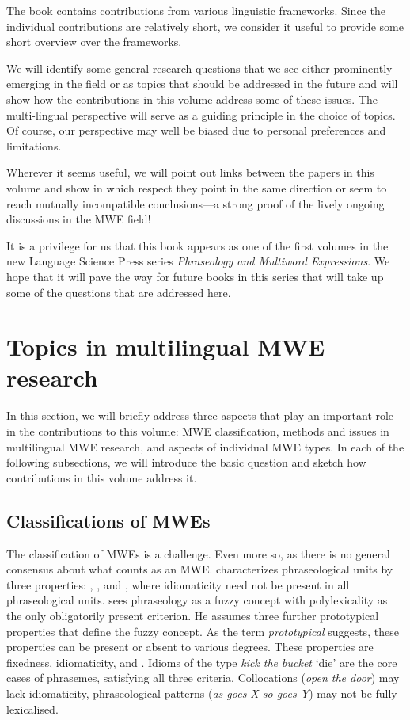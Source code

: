 \documentclass[output=paper]{langsci/langscibook}
\begin{document}
The book contains contributions from various linguistic frameworks. Since the individual contributions are relatively short, we consider it useful to provide some short overview over the frameworks. 

We will identify some general research questions that we see either prominently emerging in the field or as topics that should be addressed in the future and will show how the contributions in this volume address some of these issues. The multi-lingual perspective will serve as a guiding principle in the choice of topics. Of course, our perspective may well be biased due to personal preferences and limitations. 

Wherever it seems useful, we will point out links between the papers in this volume and show in which respect they point in the same direction or seem to reach mutually incompatible conclusions---a strong proof of the lively ongoing discussions in the MWE field!

It is a privilege for us that this book appears as one of the first volumes in the new Language Science Press series \emph{Phraseology and Multiword Expressions}. We hope that it will pave the way for future books in this series that will take up some of the questions that are addressed here.


\section{Topics in multilingual MWE research}\label{Sec-Topics}

In this section, we will briefly address three aspects that play an important role in the contributions to this volume: MWE classification, methods and issues in multilingual MWE research, and aspects of individual MWE types. In each of the following subsections, we will introduce the basic question and sketch how contributions in this volume address it.

\subsection{Classifications of MWEs}\label{Sec-Classification}
The classification of MWEs is a challenge. Even more so, as there is no general consensus about what counts as an MWE. \citet{Burger:15} characterizes phraseological units by three properties: , , and , where idiomaticity need not be present in all phraseological units. \citet{Fleischer:97} sees phraseology as a fuzzy concept with polylexicality as the only obligatorily present criterion. He assumes three further prototypical properties that define the fuzzy concept. As the term \emph{prototypical} suggests, these properties can be present or absent to various degrees. These properties are fixedness, idiomaticity, and . Idioms of the type \textit{kick the bucket} ‘die’ are the core cases of phrasemes, satisfying all three criteria. Collocations (\textit{open the door}) may lack idiomaticity, phraseological patterns (\textit{as goes X so goes Y}) may not be fully lexicalised. 
\end{document}
